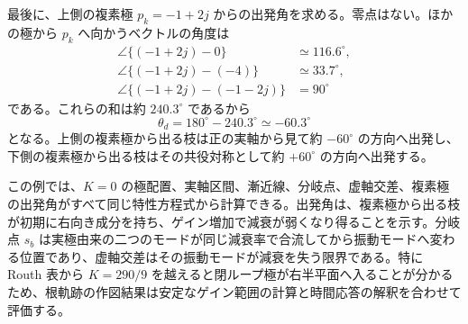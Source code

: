 \begin{example}[複素極を含む四次系の根軌跡]
最後に、上側の複素極 $p_k=-1+2j$ からの出発角を求める。零点はない。ほかの極から $p_k$ へ向かうベクトルの角度は
\begin{align}
  \angle\{(-1+2j)-0\}&\simeq116.6^\circ,\\
  \angle\{(-1+2j)-(-4)\}&\simeq33.7^\circ,\\
  \angle\{(-1+2j)-(-1-2j)\}&=90^\circ
\end{align}
である。これらの和は約 $240.3^\circ$ であるから
\begin{equation}
  \theta_d
  =180^\circ-240.3^\circ
  \simeq -60.3^\circ
\end{equation}
となる。上側の複素極から出る枝は正の実軸から見て約 $-60^\circ$ の方向へ出発し、下側の複素極から出る枝はその共役対称として約 $+60^\circ$ の方向へ出発する。

この例では、$K=0$ の極配置、実軸区間、漸近線、分岐点、虚軸交差、複素極の出発角がすべて同じ特性方程式から計算できる。出発角は、複素極から出る枝が初期に右向き成分を持ち、ゲイン増加で減衰が弱くなり得ることを示す。分岐点 $s_b$ は実極由来の二つのモードが同じ減衰率で合流してから振動モードへ変わる位置であり、虚軸交差はその振動モードが減衰を失う限界である。特に Routh 表から $K=290/9$ を越えると閉ループ極が右半平面へ入ることが分かるため、根軌跡の作図結果は安定なゲイン範囲の計算と時間応答の解釈を合わせて評価する。
\end{example}
